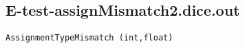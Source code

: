 \subsection{E-test-assignMismatch2.dice.out}
\begin{verbatim}
AssignmentTypeMismatch (int,float)

\end{verbatim}